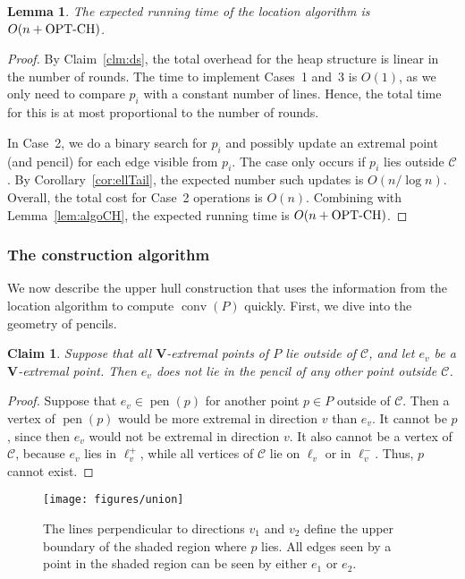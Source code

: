 \documentclass[letterpaper,11pt]{article}
\newtheorem{lemma}[theorem]{Lemma}
\newtheorem{claim}[theorem]{Claim}
\newcommand{\OPTCH}{\text{OPT-CH}}
\DeclareMathOperator{\UH}{conv}
\DeclareMathOperator{\pen}{pen}
\newcommand{\cC}{\mathcal{C}}
\begin{document}
\begin{lemma} 
  The expected running time of 
  the location algorithm is 
  $O(n + \textup{\OPTCH})$.
\end{lemma}

\begin{proof}
By Claim~\ref{clm:ds},
the total overhead for the heap 
structure is linear in the number
of rounds. The time to implement 
Cases~1 and~3 is $O(1)$, as we only 
need to compare $p_i$ with a 
constant number of lines. Hence, the 
total time for this is at most proportional to the 
number of rounds. 

In Case~2, we do a binary search 
for $p_i$ and possibly update 
an extremal point (and pencil) 
for each edge 
visible from $p_i$. The case
only occurs if $p_i$ lies 
outside $\cC$.  By 
Corollary~\ref{cor:ellTail}, the 
expected number such updates is $O(n/\log n)$. 
Overall, the total cost for Case~2 
operations is $O(n)$. Combining with 
Lemma~\ref{lem:algoCH}, the expected 
running time is 
$O(n + \textup{\OPTCH})$.
\end{proof}

\subsubsection{The construction algorithm}

We now describe the upper hull 
construction that uses the information
from the location algorithm to compute
$\UH(P)$ quickly. First, we dive 
into the geometry of pencils.

\begin{claim}\label{clm:no_pencil_overlap}
  Suppose that all 
  \textup{$\textbf{V}$}-extremal 
  points of $P$ lie outside
  of $\cC$, and let $e_v$ be a 
  \textup{$\textbf{V}$}-extremal point. 
  Then $e_v$ does not lie
  in the pencil of any other point  
  outside $\cC$.
\end{claim}

\begin{proof}
Suppose that  $e_v \in \pen(p)$ for 
another point $p \in P$ outside of
$\cC$.  Then a vertex of $\pen(p)$ would
be more extremal in direction $v$ than 
$e_v$. It cannot be $p$, since then
$e_v$ would not be extremal in direction 
$v$. It also cannot be a
vertex of $\cC$, because $e_v$ lies in 
$\ell_v^+$, while all vertices of $\cC$
lie on $\ell_v$ or in $\ell_v^-$. 
Thus, $p$ cannot exist.
\end{proof}


\begin{figure}
  \centering
  \texttt{[image: figures/union]}
  \caption{The lines perpendicular 
    to directions $v_1$ and $v_2$ define 
  the upper boundary of the shaded region 
  where $p$ lies. All edges 
  seen by a point in the shaded region 
  can be seen by either $e_1$ or $e_2$.}
  \label{fig:union}
\end{figure}
\end{document}
